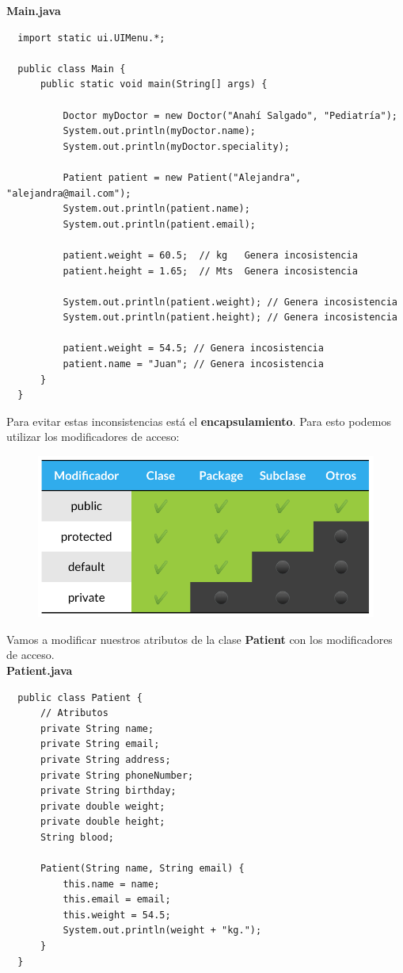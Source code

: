 \documentclass{article}
\begin{document}
\textbf{Main.java}
\begin{verbatim}
  import static ui.UIMenu.*;

  public class Main {
      public static void main(String[] args) {

          Doctor myDoctor = new Doctor("Anahí Salgado", "Pediatría");
          System.out.println(myDoctor.name);
          System.out.println(myDoctor.speciality);

          Patient patient = new Patient("Alejandra", "alejandra@mail.com");
          System.out.println(patient.name);
          System.out.println(patient.email);

          patient.weight = 60.5;  // kg   Genera incosistencia
          patient.height = 1.65;  // Mts  Genera incosistencia

          System.out.println(patient.weight); // Genera incosistencia
          System.out.println(patient.height); // Genera incosistencia

          patient.weight = 54.5; // Genera incosistencia
          patient.name = "Juan"; // Genera incosistencia
      }
  }
\end{verbatim}

Para evitar estas inconsistencias está el \textbf{encapsulamiento}. Para esto
podemos utilizar los modificadores de acceso:\\

\begin{figure}[h!]
  \centering
  \includegraphics[scale=0.5]{./Pictures/030_mod_acceso.png}
\end{figure}

Vamos a modificar nuestros atributos de la clase \textbf{Patient} con los
modificadores de acceso.\\

\textbf{Patient.java}
\begin{verbatim}
  public class Patient {
      // Atributos
      private String name;
      private String email;
      private String address;
      private String phoneNumber;
      private String birthday;
      private double weight;
      private double height;
      String blood;

      Patient(String name, String email) {
          this.name = name;
          this.email = email;
          this.weight = 54.5;
          System.out.println(weight + "kg.");
      }
  }
\end{verbatim}
\end{document}
